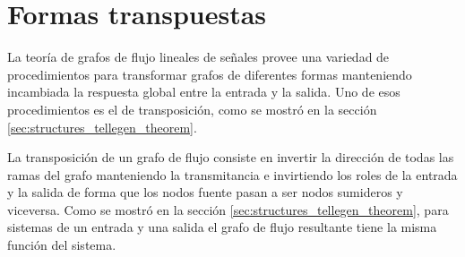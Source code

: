 \documentclass[a4paper]{report}
\begin{document}
\section{Formas transpuestas}\label{sec:structures_transposed_forms}

La teoría de grafos de flujo lineales de señales provee una variedad de procedimientos para transformar grafos de diferentes formas manteniendo incambiada la respuesta global entre la entrada y la salida. Uno de esos procedimientos es el de transposición, como se mostró en la sección \ref{sec:structures_tellegen_theorem}. 

La transposición de un grafo de flujo consiste en invertir la dirección de todas las ramas del grafo manteniendo la transmitancia e invirtiendo los roles de la entrada y la salida de forma que los nodos fuente pasan a ser nodos sumideros y viceversa. Como se mostró en la sección \ref{sec:structures_tellegen_theorem}, para sistemas de un entrada y una salida el grafo de flujo resultante tiene la misma función del sistema.
\end{document}
